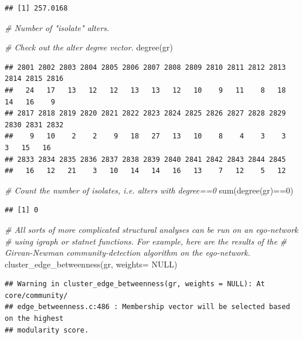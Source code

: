 \documentclass[
]{book}
\newenvironment{Shaded}{\begin{snugshade}}{\end{snugshade}}
\newcommand{\AttributeTok}[1]{\textcolor[rgb]{0.77,0.63,0.00}{#1}}
\newcommand{\CommentTok}[1]{\textcolor[rgb]{0.56,0.35,0.01}{\textit{#1}}}
\newcommand{\ConstantTok}[1]{\textcolor[rgb]{0.00,0.00,0.00}{#1}}
\newcommand{\DecValTok}[1]{\textcolor[rgb]{0.00,0.00,0.81}{#1}}
\newcommand{\FunctionTok}[1]{\textcolor[rgb]{0.00,0.00,0.00}{#1}}
\newcommand{\NormalTok}[1]{#1}
\newcommand{\SpecialCharTok}[1]{\textcolor[rgb]{0.00,0.00,0.00}{#1}}
\begin{document}
\begin{verbatim}
## [1] 257.0168
\end{verbatim}

\begin{Shaded}
\begin{Highlighting}[]
\CommentTok{\# Number of "isolate" alters.}

\CommentTok{\# Check out the alter degree vector.}
\FunctionTok{degree}\NormalTok{(gr)}
\end{Highlighting}
\end{Shaded}

\begin{verbatim}
## 2801 2802 2803 2804 2805 2806 2807 2808 2809 2810 2811 2812 2813 2814 2815 2816 
##   24   17   13   12   12   13   13   12   10    9   11    8   18   14   16    9 
## 2817 2818 2819 2820 2821 2822 2823 2824 2825 2826 2827 2828 2829 2830 2831 2832 
##    9   10    2    2    9   18   27   13   10    8    4    3    3    3   15   16 
## 2833 2834 2835 2836 2837 2838 2839 2840 2841 2842 2843 2844 2845 
##   16   12   21    3   10   14   14   16   13    7   12    5   12
\end{verbatim}

\begin{Shaded}
\begin{Highlighting}[]
\CommentTok{\# Count the number of isolates, i.e. alters with degree==0}
\FunctionTok{sum}\NormalTok{(}\FunctionTok{degree}\NormalTok{(gr)}\SpecialCharTok{==}\DecValTok{0}\NormalTok{)}
\end{Highlighting}
\end{Shaded}

\begin{verbatim}
## [1] 0
\end{verbatim}

\begin{Shaded}
\begin{Highlighting}[]
\CommentTok{\# All sorts of more complicated structural analyses can be run on an ego{-}network}
\CommentTok{\# using igraph or statnet functions. For example, here are the results of the}
\CommentTok{\# Girvan{-}Newman community{-}detection algorithm on the ego{-}network.}
\FunctionTok{cluster\_edge\_betweenness}\NormalTok{(gr, }\AttributeTok{weights=} \ConstantTok{NULL}\NormalTok{)}
\end{Highlighting}
\end{Shaded}

\begin{verbatim}
## Warning in cluster_edge_betweenness(gr, weights = NULL): At core/community/
## edge_betweenness.c:486 : Membership vector will be selected based on the highest
## modularity score.
\end{verbatim}
\end{document}
